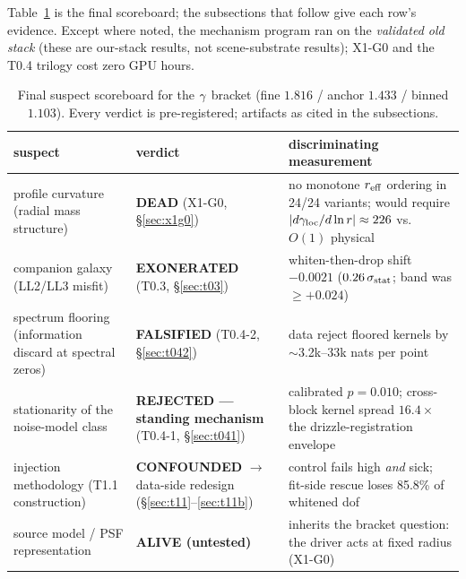 \medskip
Table~\ref{tab:suspects} is the final scoreboard; the subsections that follow
give each row's evidence. Except where noted, the mechanism program ran on
the \emph{validated old stack} (these are our-stack results, not
scene-substrate results); X1-G0 and the T0.4 trilogy cost zero GPU hours.

\begin{table}[htbp]
\centering
\caption{Final suspect scoreboard for the $\gamma$ bracket
(fine $1.816$ / anchor $1.433$ / binned $1.103$). Every verdict is
pre-registered; artifacts as cited in the subsections.}
\label{tab:suspects}
\small
\begin{tabular}{p{}p{}p{}}
\toprule
suspect & verdict & discriminating measurement \\
\midrule
profile curvature (radial mass structure) & \textbf{DEAD} (X1-G0, \S\ref{sec:x1g0}) &
  no monotone $r_{\rm eff}$ ordering in 24/24 variants; would require
  $|d\gamma_{\rm loc}/d\ln r|\approx226$ vs.\ $O(1)$ physical \\
companion galaxy (LL2/LL3 misfit) & \textbf{EXONERATED} (T0.3, \S\ref{sec:t03}) &
  whiten-then-drop shift $-0.0021$ ($0.26\,\sigma_{\rm stat}$; band was $\ge+0.024$) \\
spectrum flooring (information discard at spectral zeros) & \textbf{FALSIFIED} (T0.4-2, \S\ref{sec:t042}) &
  data reject floored kernels by $\sim$3.2k--33k nats per point \\
stationarity of the noise-model class & \textbf{REJECTED --- standing mechanism} (T0.4-1, \S\ref{sec:t041}) &
  calibrated $p=0.010$; cross-block kernel spread $16.4\times$ the drizzle-registration envelope \\
injection methodology (T1.1 construction) & \textbf{CONFOUNDED} $\to$ data-side redesign (\S\ref{sec:t11}--\ref{sec:t11b}) &
  control fails high \emph{and} sick; fit-side rescue loses 85.8\% of whitened dof \\
source model / PSF representation & \textbf{ALIVE (untested)} &
  inherits the bracket question: the driver acts at fixed radius (X1-G0) \\
\bottomrule
\end{tabular}
\end{table}

